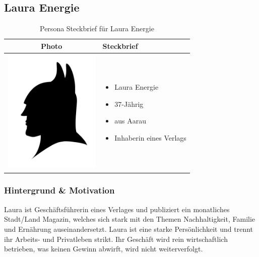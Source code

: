 \subsection{Laura Energie}
\begin{table}[h!]
  \centering
  \begin{tabular}{ | c | m{5cm} | }
    \hline
    Photo & Steckbrief \\ \hline
    \begin{minipage}{.3\textwidth}
      \includegraphics[width=\linewidth, height=60mm]{images/batman.jpg}
    \end{minipage}
    &
      \begin{itemize}
        \item Laura Energie
        \item 37-Jährig
        \item aus Aarau
        \item Inhaberin eines Verlags
      \end{itemize}
    \\ \hline
  \end{tabular}
  \caption{Persona Steckbrief für Laura Energie}\label{tbl:steckbrieflaura}
\end{table}

\subsubsection{Hintergrund \& Motivation}
Laura ist Geschäftsführerin eines Verlages und publiziert ein monatliches Stadt/Land Magazin, welches sich stark mit den Themen Nachhaltigkeit, Familie und Ernährung auseinandersetzt. Laura ist eine starke Persönlichkeit und trennt ihr Arbeits- und Privatleben strikt. Ihr Geschäft wird rein wirtschaftlich betrieben, was keinen Gewinn abwirft, wird nicht weiterverfolgt.

